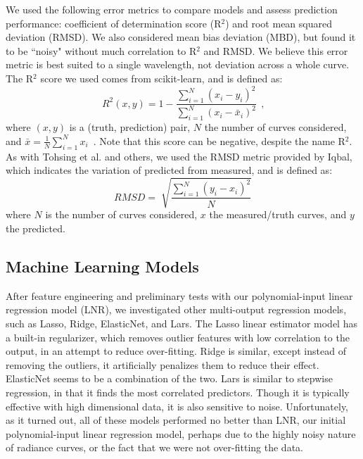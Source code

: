 We used the following error metrics to compare models and assess prediction performance: coefficient of determination score (R$^2$) and root mean squared deviation (RMSD). We also considered mean bias deviation (MBD), but found it to be ``noisy" without much correlation to R$^2$ and RMSD. We believe this error metric is best suited to a single wavelength, not deviation across a whole curve. The R$^2$ score we used comes from scikit-learn,\cite{pedregosa_scikit} and is defined as:
\begin{equation}
\label{eq:r2}
R^2(x,y) = 1 - \frac{\sum_{i=1}^{N} (x_i-y_i)^2} {\sum_{i=1}^{N} (x_i-\bar{x}_i)^2} ~~\textrm{,}
\end{equation}
where $(x,y)$ is a (truth, prediction) pair, $N$ the number of curves considered, and $\bar{x} = \frac{1}{N}\sum_{i=1}^{N} x_i$~. Note that this score can be negative, despite the name R$^2$. As with Tohsing et al.\cite{tohsing_validation_2014} and others, we used the RMSD metric provided by Iqbal,\cite{iqbal_intro} which indicates the variation of predicted from measured, and is defined as:
\begin{equation}
\label{eq:mbd}
RMSD=\sqrt[]{\frac{\sum_{i=1}^{N} (y_i-x_i)^2}{N}}
\end{equation}
where $N$ is the number of curves considered, $x$ the measured/truth curves, and $y$ the predicted.

\subsection{Machine Learning Models}

After feature engineering and preliminary tests with our polynomial-input linear regression model (LNR), we investigated other multi-output regression models, such as Lasso,\cite{tibshirani_lasso} Ridge,\cite{hoerl_ridge} ElasticNet,\cite{zou_elastic} and Lars. The Lasso linear estimator model has a built-in regularizer, which removes outlier features with low correlation to the output, in an attempt to reduce over-fitting. Ridge is similar, except instead of removing the outliers, it artificially penalizes them to reduce their effect. ElasticNet seems to be a combination of the two. Lars is similar to stepwise regression, in that it finds the most correlated predictors. Though it is typically effective with high dimensional data, it is also sensitive to noise. Unfortunately, as it turned out, all of these models performed no better than LNR, our initial polynomial-input linear regression model, perhaps due to the highly noisy nature of radiance curves, or the fact that we were not over-fitting the data.

